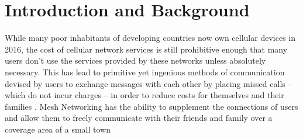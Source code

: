 \section{Introduction and Background}
While many poor inhabitants of developing countries now own cellular devices in 2016, the cost
of cellular network services is still prohibitive enough that many users don't use the services
provided by these networks unless absolutely necessary.
This has lead to primitive yet ingenious methods of communication devised by users to exchange 
messages with each other by placing missed calls -- which do not incur charges -- in order to 
reduce costs for themselves and their families \cite{beeping}.
Mesh Networking has the ability to supplement the connections of users and allow them to freely 
communicate with their friends and family over a coverage area of a small town
